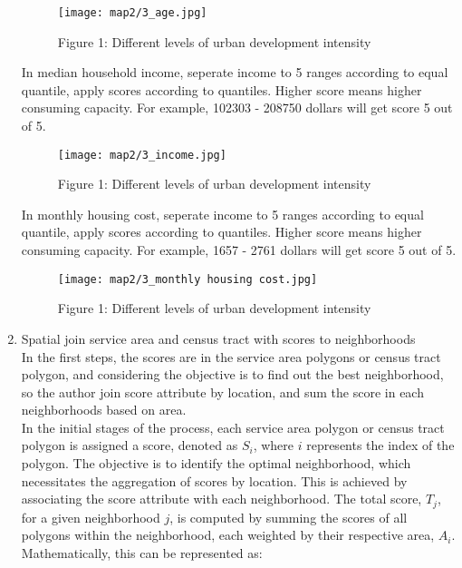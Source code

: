 \documentclass[11pt]{article}
\begin{document}
\begin{enumerate}
{\begin{figure}[H]
\begin{center}
\centering
\texttt{[image: map2/3\_age.jpg]}
\caption{Figure 1: Different levels of urban development intensity}
\label{fig:figure1}
\end{center}
\end{figure}
In median household income, seperate income to 5 ranges according to equal quantile, apply scores according to quantiles. Higher score means higher consuming capacity. For example, 102303 - 208750 dollars will get score 5 out of 5.
\begin{figure}[H]
\begin{center}
\centering
\texttt{[image: map2/3\_income.jpg]}
\caption{Figure 1: Different levels of urban development intensity}
\label{fig:figure1}
\end{center}
\end{figure}
In monthly housing cost, seperate income to 5 ranges according to equal quantile, apply scores according to quantiles. Higher score means higher consuming capacity. For example, 1657 - 2761 dollars will get score 5 out of 5.
\begin{figure}[H]
\begin{center}
\centering
\texttt{[image: map2/3\_monthly housing cost.jpg]}
\caption{Figure 1: Different levels of urban development intensity}
\label{fig:figure1}
\end{center}
\end{figure}
}

\item{Spatial join service area and census tract with scores to neighborhoods\\
In the first steps, the scores are in the service area polygons or census tract polygon, and considering the objective is to find out the best neighborhood, so the author join score attribute by location, and sum the score in each neighborhoods based on area.\\
In the initial stages of the process, each service area polygon or census tract polygon is assigned a score, denoted as $S_i$, where $i$ represents the index of the polygon. The objective is to identify the optimal neighborhood, which necessitates the aggregation of scores by location. This is achieved by associating the score attribute with each neighborhood. The total score, $T_j$, for a given neighborhood $j$, is computed by summing the scores of all polygons within the neighborhood, each weighted by their respective area, $A_i$. Mathematically, this can be represented as:

}
\end{enumerate}
\end{document}
